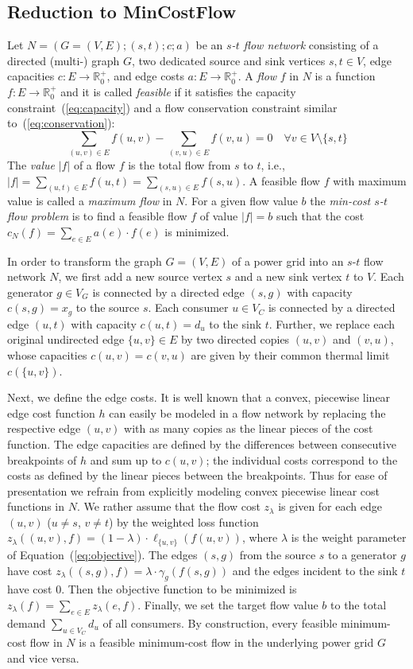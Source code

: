 \documentclass{article}[11pt,a4paper]
\begin{document}
\subsection{Reduction to MinCostFlow}
\label{sec:model-mincost-flow}
Let  $N = (G = (V,E); (s,t); c; a)$ be an \emph{$s$-$t$ flow network}
consisting of a directed \mbox{(multi-)} graph $G$, two dedicated source and sink vertices $s, t \in V$, edge capacities $c: E \to \mathbb R_0^+$, and edge costs $a: E \to \mathbb R_0^+$. 
A \emph{flow} $f$ in $N$ is a function $f: E \to \mathbb R_0^+$ and it is called \emph{feasible} if it satisfies the capacity constraint~(\ref{eq:capacity}) and a flow conservation constraint similar to~(\ref{eq:conservation}):
\begin{equation}\label{eq:flow}
 \sum_{(u,v) \in E} f(u,v) - \sum_{(v,u) \in E} f(v,u) =  0 \quad \forall v \in V\setminus \{s,t\}
\end{equation}
The \emph{value} $|f|$ of a flow $f$ is the total flow from $s$ to $t$, i.e., $|f| = \sum_{(u,t) \in E} f(u,t) = \sum_{(s,u) \in E} f(s,u)$. A feasible flow $f$ with maximum value is called a \emph{maximum flow} in $N$.
For a given flow value $b$ the \emph{min-cost $s$-$t$ flow problem} is to find a feasible flow $f$ of value $|f| = b$ such that the cost $c_N(f) = \sum_{e \in E} a(e) \cdot f(e)$ is minimized.

In order to transform the graph $G=(V,E)$ of a power grid into an $s$-$t$ flow network $N$, we first add a new source vertex $s$ and a new sink vertex $t$ to $V$. 
Each generator $g \in V_G$ is connected by a directed edge $(s,g)$ with capacity $c(s,g) = x_g$ to the source $s$. 
Each consumer $u \in V_C$ is connected by a directed edge $(u,t)$ with capacity $c(u,t) = d_u$ to the sink $t$. 
Further, we replace each original undirected edge $\{u,v\} \in E$ by two directed copies $(u,v)$ and $(v,u)$, whose capacities $c(u,v) = c(v,u)$ are given by their common thermal limit $c(\{u,v\})$. 

Next, we define the edge costs. 
It is well known that a convex, piecewise linear edge cost function $h$ can easily be modeled in a flow network by replacing the respective edge $(u,v)$ with as many copies as the linear pieces of the cost function. 
The edge capacities are defined by the differences between consecutive breakpoints of $h$ and sum up to $c(u,v)$; the individual costs correspond to the costs as defined by the linear pieces between the breakpoints. 
Thus for ease of presentation we refrain from explicitly modeling convex piecewise linear cost functions in $N$. 
We rather assume that the flow cost $z_\lambda$ is given for each edge $(u,v)$ ($u \ne s$, $v \ne t$) by the weighted loss function $z_\lambda((u,v),f) = (1-\lambda) \cdot \ell_{\{u,v\}}(f(u,v))$, where $\lambda$ is the weight parameter of Equation~(\ref{eq:objective}). 
The edges $(s,g)$ from the source $s$ to a generator $g$ have cost $z_\lambda((s,g),f) = \lambda \cdot \gamma_g(f(s,g))$ and the edges incident to the sink $t$ have cost $0$. 
Then the objective function to be minimized is $z_\lambda(f) = \sum_{e \in E} z_\lambda(e,f)$.
Finally, we set the target flow value $b$ to the total demand $\sum_{u \in V_C} d_u$ of all consumers. 
By construction, every feasible minimum-cost flow in $N$ is a feasible minimum-cost flow in the underlying power grid $G$ and vice versa.
\end{document}
